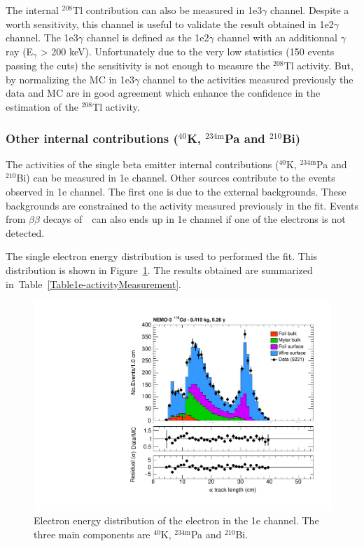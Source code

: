 \documentclass[main.tex]{subfiles}
\begin{document}
\bigskip


\NI The internal $^{\text{208}}$Tl contribution can also be measured in 1e3$\gamma$ channel. Despite a worth sensitivity, this channel is useful to validate the result obtained in 1e2$\gamma$ channel. The 1e3$\gamma$ channel is defined as the  1e2$\gamma$ channel with an additionnal $\gamma$ ray (E$_{\gamma}$ > 200 keV). Unfortunately due to the very low statistics (150 events passing the cuts) the sensitivity is not enough to measure the $^{208}$Tl activity. But, by normalizing the MC in 1e3$\gamma$ channel to the activities measured previously the data and MC are in good agreement which enhance the confidence in the estimation of the $^{208}$Tl activity. 


\FloatBarrier


\subsubsection{Other internal contributions ($^{\text{40}}$K, $^{\text{234m}}$Pa and $^{\text{210}}$Bi)}\label{sec:1echannel}


\NI The activities of the single beta emitter internal contributions ($^{\text{40}}$K, $^{\text{234m}}$Pa and $^{\text{210}}$Bi) can be measured in 1e channel. Other sources contribute to the events observed in 1e channel. The first one is due to the external backgrounds. These backgrounds are constrained to the activity measured previously in the fit. Events from $\beta\beta$ decays of~\Cd~can also ends up in 1e channel if one of the electrons is not detected. 


\bigskip


\NI The single electron energy distribution is used to performed the fit. This distribution is shown in Figure~\ref{1eChannel_Ee}. The results obtained are summarized in~Table~\ref{Table1e-activityMeasurement}. 


\begin{figure}[h!]
\centering
\includegraphics[page=4,scale=0.55]{pictures/Chap6/FinalPlots.pdf}
\caption{Electron energy distribution of the electron in the 1e channel. The three main components are $^{\text{40}}$K, $^{\text{234m}}$Pa and $^{\text{210}}$Bi.}
\label{1eChannel_Ee}
\end{figure}
\end{document}
